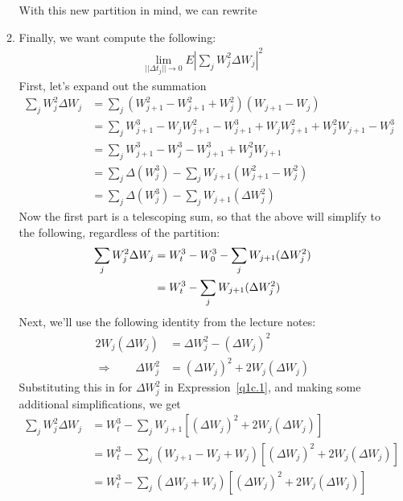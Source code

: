 \documentclass[12pt]{article}
\theoremstyle{plain}
\theoremstyle{definition}
\theoremstyle{remark}
\begin{document}
\begin{enumerate}
\begin{enumerate}
      With this new partition in mind, we can rewrite

    \item %
      Finally, we want compute the following:
      \begin{align*}
        \lim_{||\Delta t_j||\rightarrow 0}
        E\left\lvert \sum_j W_j^2 \Delta W_j\right\rvert^2
      \end{align*}
      First, let's expand out the summation
      \begin{align*}
        \sum_j W_j^2 \Delta W_j
        &= \sum_j (W_{j+1}^2 -W_{j+1}^2 + W_j^2) ( W_{j+1} - W_j)\\
        &= \sum_j W_{j+1}^3 - W_{j}W_{j+1}^2 - W_{j+1}^3
          + W_{j}W_{j+1}^2 + W_{j}^2W_{j+1} - W_{j}^3\\
        &= \sum_j W_{j+1}^3 - W_{j}^3 - W_{j+1}^3 + W_{j}^2W_{j+1}\\
        &= \sum_j \Delta(W^3_{j}) - \sum_j W_{j+1}( W_{j+1}^2 - W_{j}^2)\\
        &= \sum_j \Delta(W^3_{j}) - \sum_j W_{j+1}(\Delta W_{j}^2)
      \end{align*}
      Now the first part is a telescoping sum, so that the above will
      simplify to the following, regardless of the partition:
      \begin{align}
        \sum_j W_j^2 \Delta W_j
        &= W^3_t - W^3_0 - \sum_j W_{j+1}(\Delta W_{j}^2)\notag\\
        &= W^3_t - \sum_j W_{j+1}(\Delta W_{j}^2)
        \label{q1c.1}
      \end{align}
      Next, we'll use the following identity from the lecture notes:
      \begin{align*}
        2 W_j (\Delta W_j) &= \Delta W_j^2 - (\Delta W_j)^2 \\
        \Rightarrow \qquad
        \Delta W_j^2 &= (\Delta W_j)^2  +  2 W_j (\Delta W_j)
      \end{align*}
      Substituting this in for $\Delta W_j^2$ in Expression~\ref{q1c.1},
      and making some additional simplifications, we get
      \begin{align*}
        \sum_j W_j^2 \Delta W_j
        &= W^3_t - \sum_j W_{j+1}
          \left[(\Delta W_j)^2  +  2 W_j (\Delta W_j)\right]\\
        &= W^3_t - \sum_j (W_{j+1}-W_j + W_j)
          \left[(\Delta W_j)^2  +  2 W_j (\Delta W_j)\right]\\
        &= W^3_t - \sum_j (\Delta W_{j}+ W_j)
          \left[(\Delta W_j)^2  +  2 W_j (\Delta W_j)\right]\\

\end{align*}
\end{enumerate}
\end{enumerate}
\end{document}

